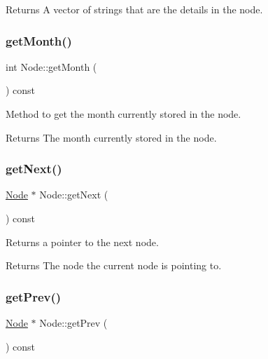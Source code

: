 \begin{DoxyReturn}{Returns}
A vector of strings that are the details in the node. 
\end{DoxyReturn}
\hypertarget{class_node_a6c0cdac83e0e0fbb2cb594715a4feb5e}{}\label{class_node_a6c0cdac83e0e0fbb2cb594715a4feb5e} 
\subsubsection{\texorpdfstring{get\+Month()}{getMonth()}}
{\footnotesize\ttfamily int Node\+::get\+Month (\begin{DoxyParamCaption}{ }\end{DoxyParamCaption}) const}



Method to get the month currently stored in the node. 

\begin{DoxyReturn}{Returns}
The month currently stored in the node. 
\end{DoxyReturn}
\hypertarget{class_node_a7207ac6b9786567730715f0d2a230764}{}\label{class_node_a7207ac6b9786567730715f0d2a230764} 
\subsubsection{\texorpdfstring{get\+Next()}{getNext()}}
{\footnotesize\ttfamily \hyperlink{class_node}{Node} $\ast$ Node\+::get\+Next (\begin{DoxyParamCaption}{ }\end{DoxyParamCaption}) const}



Returns a pointer to the next node. 

\begin{DoxyReturn}{Returns}
The node the current node is pointing to. 
\end{DoxyReturn}
\hypertarget{class_node_af3a5d9a808825f8fb5c3cbe1d51abe68}{}\label{class_node_af3a5d9a808825f8fb5c3cbe1d51abe68} 
\subsubsection{\texorpdfstring{get\+Prev()}{getPrev()}}
{\footnotesize\ttfamily \hyperlink{class_node}{Node} $\ast$ Node\+::get\+Prev (\begin{DoxyParamCaption}{ }\end{DoxyParamCaption}) const}



